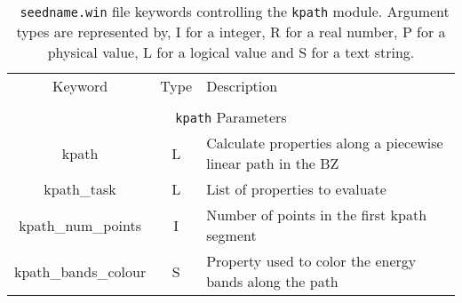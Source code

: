 \begin{table}[hH!]
\begin{center}
\begin{tabular}{|c|c|p{6cm}|}
  \hline
  Keyword & Type & Description \\
  &      &             \\
  \hline\hline
  \multicolumn{3}{|c|}{{\tt kpath} Parameters} \\
  \hline
  {\sc kpath}  & L & Calculate properties along a piecewise linear path in the BZ \\
  {\sc kpath\_task}& L & List of properties to evaluate\\
  {\sc kpath\_num\_points}& I & Number of points in the first kpath segment\\
  {\sc kpath\_bands\_colour}& S & Property used to color the energy bands along the path\\
  \hline
\end{tabular}
\caption[Parameter file keywords controlling the kpath module.]  {{\tt
    seedname.win} file keywords controlling the {\tt kpath}
  module. Argument types are represented by, I for a integer, R for a
  real number, P for a physical value, L for a logical value and S for
  a text string.}
\label{parameter_keywords_kpath}
\end{center}
\end{table}

